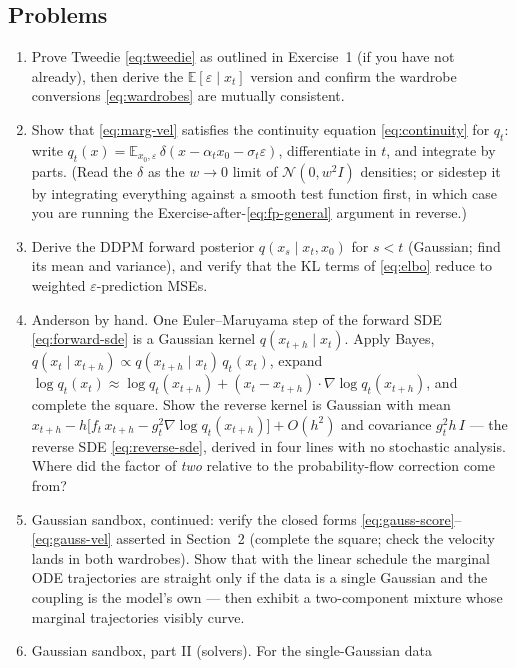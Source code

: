 \documentclass[10pt,a4paper]{article}
\newcommand{\E}{\mathbb{E}}
\newcommand{\veps}{\varepsilon}
\begin{document}
\subsection*{Problems}

\begin{enumerate}
\item Prove Tweedie \eqref{eq:tweedie} as outlined in Exercise~1 (if you
have not already), then derive the
$\E[\veps \mid x_t]$ version and confirm the wardrobe conversions
\eqref{eq:wardrobes} are mutually consistent.
\item \label{prob:continuity} Show that \eqref{eq:marg-vel} satisfies the
continuity equation \eqref{eq:continuity} for $q_t$: write
$q_t(x) = \E_{x_0,\veps}\,\delta(x - \alpha_t x_0 - \sigma_t\veps)$,
differentiate in $t$, and integrate by parts. (Read the $\delta$ as the
$w \to 0$ limit of $\mathcal{N}(0, w^2 I)$ densities; or sidestep it by
integrating everything against a smooth test function first, in which
case you are running the Exercise-after-\eqref{eq:fp-general} argument
in reverse.)
\item \label{prob:posterior} Derive the DDPM forward posterior
$q(x_s \mid x_t, x_0)$ for $s < t$ (Gaussian; find its mean and variance),
and verify that the KL terms of \eqref{eq:elbo} reduce to weighted
$\veps$-prediction MSEs.
\item \label{prob:anderson} Anderson by hand. One Euler--Maruyama step
of the forward SDE \eqref{eq:forward-sde} is a Gaussian kernel
$q(x_{t+h} \mid x_t)$. Apply Bayes,
$q(x_t \mid x_{t+h}) \propto q(x_{t+h} \mid x_t)\, q_t(x_t)$, expand
$\log q_t(x_t) \approx \log q_t(x_{t+h}) + (x_t - x_{t+h}) \cdot
\nabla \log q_t(x_{t+h})$, and complete the square. Show the reverse
kernel is Gaussian with mean
$x_{t+h} - h\big[ f_t\, x_{t+h} - g_t^2 \nabla\log q_t(x_{t+h}) \big] + O(h^2)$ and
covariance $g_t^2 h\, I$ --- the reverse SDE \eqref{eq:reverse-sde},
derived in four lines with no stochastic analysis. Where did the factor
of \emph{two} relative to the probability-flow correction come from?
\item Gaussian sandbox, continued: verify the closed forms
\eqref{eq:gauss-score}--\eqref{eq:gauss-vel} asserted in Section~2
(complete the square; check the velocity lands in both wardrobes). Show
that with the linear
schedule the marginal ODE trajectories are straight only if the data is a
single Gaussian and the coupling is the model's own --- then exhibit a
two-component mixture whose marginal trajectories visibly curve.
\item Gaussian sandbox, part II (solvers). For the single-Gaussian data

\end{enumerate}
\end{document}
